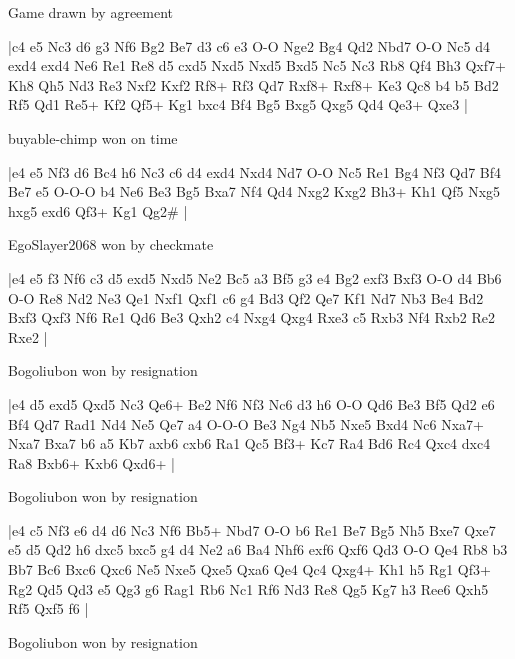 \showboard

Game drawn by agreement

\makegametitle
|c4 e5 Nc3 d6 g3 Nf6 Bg2 Be7 d3 c6 e3 O-O Nge2 Bg4 Qd2 Nbd7 O-O Nc5 d4 exd4 exd4 Ne6 Re1 Re8 d5 cxd5 Nxd5 Nxd5 Bxd5 Nc5 Nc3 Rb8 Qf4 Bh3 Qxf7+ Kh8 Qh5 Nd3 Re3 Nxf2 Kxf2 Rf8+ Rf3 Qd7 Rxf8+ Rxf8+ Ke3 Qc8 b4 b5 Bd2 Rf5 Qd1 Re5+ Kf2 Qf5+ Kg1 bxc4 Bf4 Bg5 Bxg5 Qxg5 Qd4 Qe3+ Qxe3  |

\showboard

buyable-chimp won on time

\makegametitle
|e4 e5 Nf3 d6 Bc4 h6 Nc3 c6 d4 exd4 Nxd4 Nd7 O-O Nc5 Re1 Bg4 Nf3 Qd7 Bf4 Be7 e5 O-O-O b4 Ne6 Be3 Bg5 Bxa7 Nf4 Qd4 Nxg2 Kxg2 Bh3+ Kh1 Qf5 Nxg5 hxg5 exd6 Qf3+ Kg1 Qg2\#  |

\showboard

EgoSlayer2068 won by checkmate

\makegametitle
|e4 e5 f3 Nf6 c3 d5 exd5 Nxd5 Ne2 Bc5 a3 Bf5 g3 e4 Bg2 exf3 Bxf3 O-O d4 Bb6 O-O Re8 Nd2 Ne3 Qe1 Nxf1 Qxf1 c6 g4 Bd3 Qf2 Qe7 Kf1 Nd7 Nb3 Be4 Bd2 Bxf3 Qxf3 Nf6 Re1 Qd6 Be3 Qxh2 c4 Nxg4 Qxg4 Rxe3 c5 Rxb3 Nf4 Rxb2 Re2 Rxe2  |

\showboard

Bogoliubon won by resignation

\makegametitle
|e4 d5 exd5 Qxd5 Nc3 Qe6+ Be2 Nf6 Nf3 Nc6 d3 h6 O-O Qd6 Be3 Bf5 Qd2 e6 Bf4 Qd7 Rad1 Nd4 Ne5 Qe7 a4 O-O-O Be3 Ng4 Nb5 Nxe5 Bxd4 Nc6 Nxa7+ Nxa7 Bxa7 b6 a5 Kb7 axb6 cxb6 Ra1 Qc5 Bf3+ Kc7 Ra4 Bd6 Rc4 Qxc4 dxc4 Ra8 Bxb6+ Kxb6 Qxd6+  |

\showboard

Bogoliubon won by resignation

\makegametitle
|e4 c5 Nf3 e6 d4 d6 Nc3 Nf6 Bb5+ Nbd7 O-O b6 Re1 Be7 Bg5 Nh5 Bxe7 Qxe7 e5 d5 Qd2 h6 dxc5 bxc5 g4 d4 Ne2 a6 Ba4 Nhf6 exf6 Qxf6 Qd3 O-O Qe4 Rb8 b3 Bb7 Bc6 Bxc6 Qxc6 Ne5 Nxe5 Qxe5 Qxa6 Qe4 Qc4 Qxg4+ Kh1 h5 Rg1 Qf3+ Rg2 Qd5 Qd3 e5 Qg3 g6 Rag1 Rb6 Nc1 Rf6 Nd3 Re8 Qg5 Kg7 h3 Ree6 Qxh5 Rf5 Qxf5 f6  |

\showboard

Bogoliubon won by resignation

